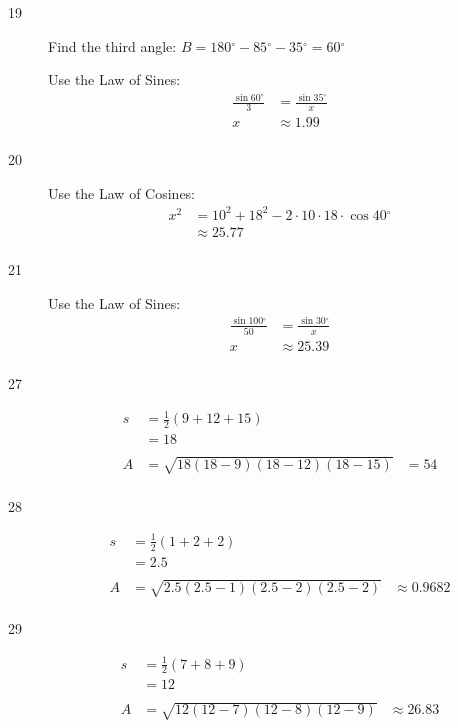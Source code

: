 \documentclass{exam}
\newcommand{\dg}{\ensuremath{^\circ}}
\begin{document}
\begin{description}
      \item[19]
        Find the third angle: $B = 180 \dg - 85 \dg - 35 \dg = 60 \dg$

        Use the Law of Sines:
        \begin{align*}
          \frac{\sin 60 \dg}{3} & = \frac{\sin 35 \dg}{x} \\
          x                        & \approx \boxed{ 1.99 } \\
        \end{align*}

      \item[20]
        Use the Law of Cosines:
        \begin{align*}
          x^2 & = 10^2 + 18^2 - 2 \cdot 10 \cdot 18 \cdot \cos 40 \dg \\
              & \approx \boxed{ 25.77 } \\
        \end{align*}

      \item[21]
        Use the Law of Sines:
        \begin{align*}
          \frac{\sin 100 \dg}{50} & = \frac{\sin 30 \dg}{x} \\
          x                       & \approx \boxed{ 25.39 } \\
        \end{align*}

      \item[27]
        \begin{align*}
          s  & = \frac{1}{2}(9 + 12 + 15) \\
             & = 18 \\
          \\
          A  & = \sqrt{18 (18 - 9)(18 - 12) (18 - 15)}
             & = 54 \\
        \end{align*}

      \item[28]
        \begin{align*}
          s  & = \frac{1}{2}(1 + 2 + 2) \\
             & = 2.5 \\
          \\
          A  & = \sqrt{2.5 (2.5 - 1)(2.5 - 2) (2.5 - 2)}
             & \approx \boxed{ 0.9682 } \\
        \end{align*}

      \item[29]
        \begin{align*}
          s  & = \frac{1}{2}(7 + 8 + 9) \\
             & = 12 \\
          \\
          A  & = \sqrt{12 (12 - 7)(12 - 8) (12 - 9)}
             & \approx \boxed{ 26.83 } \\
        \end{align*}


\end{description}
\end{document}
